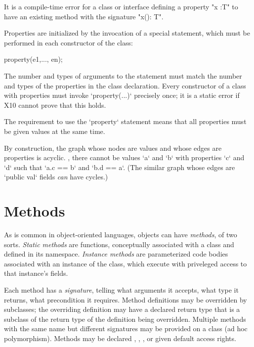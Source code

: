 \begin{staticrule*}
It is a compile-time error for a class or
interface defining a property \xcd"x :T" to have an existing method with
the signature \xcd"x(): T".
\end{staticrule*}


Properties are initialized by the invocation of a special 
statement, which must be performed in each constructor of the class:
\begin{xten}
property(e1,..., en);
\end{xten}
The number and types of arguments to the  statement must match
the number and types of the properties in the class declaration.  
Every constructor of a class with properties must invoke \xcd`property(...)`
precisely once; it is a static error if X10 cannot prove that this holds.

The requirement to use the \xcd`property` statement means that all properties
must be given values at the same time.  

By construction, the graph whose nodes are values and whose edges are
properties is acyclic.  \Eg, there cannot be values \xcd`a` and \xcd`b` with
properties \xcd`c` and \xcd`d` such that \xcd`a.c == b` and \xcd`b.d == a`.
(The similar graph whose edges are \xcd`public val` fields {\em can} have
cycles.) 


\label{PropertyCall}







\section{Methods}

As is common in object-oriented languages, objects can have {\em methods}, of
two sorts.  {\em Static methods} are functions, conceptually associated with a
class and defined in its namespace.  {\em Instance methods} are parameterized
code bodies associated with an instance of the class, which execute with
priveleged access to that instance's fields. 

Each method has a {\em signature}, telling what arguments it accepts, what
type it returns, what precondition it requires. Method definitions may be
overridden by subclasses; the overriding definition may have a declared return
type that is a subclass of the return type of the definition being overridden.
Multiple methods with the same name but different signatures may be provided
on a class (ad hoc polymorphism). Methods may be declared ,
, , or given default access rights.


